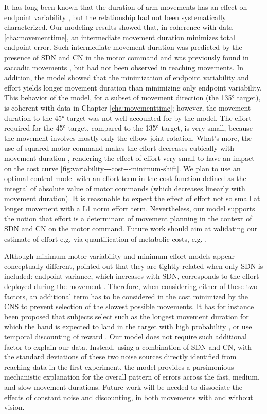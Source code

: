 It has long been known that the duration of arm movements has an effect on endpoint variability  \cite{Woodworth1899, Fitts1954}, but the relationship had not been systematically characterized. 
Our modeling results showed that, in coherence with data \ref{cha:movementtime}, an intermediate movement duration minimizes total endpoint error. 
Such intermediate movement duration was predicted by the presence of SDN and CN in the motor command and was previously found in saccadic movements \cite{VanBeers2008}, but had not been observed in reaching movements. 
In addition, the model showed that the minimization of endpoint variability and effort yields longer movement duration than minimizing only endpoint variability.
This behavior of the model, for a subset of movement direction (the \ang{135} target), is coherent with data in Chapter \ref{cha:movementtime}; however, the movement duration to the \ang{45} target was not well accounted for by the model. The effort required for the \ang{45} target, compared to the \ang{135} target, is very small, because the movement involves mostly only the elbow joint rotation. 
What's more, the use of squared motor command makes the effort decreases cubically with movement duration \cite{Shadmehr2016}, rendering the effect of effort very small to have an impact on the cost curve \ref{fig:variability---cost---minimum-shift}. 
We plan to use an optimal control model with an effort term in the cost function defined as the integral of absolute value of motor commands (which decreases linearly with movement duration).
It is reasonable to expect the effect of effort not so small at longer movement with a L1 norm effort term.
Nevertheless, our model supports the notion that effort is a determinant of movement planning in the context of SDN and CN on the motor command. 
Future work should aim at validating our estimate of effort e.g. via quantification of metabolic costs, e.g. \cite{Huang2012}.

Although minimum motor variability and minimum effort models appear conceptually different, \cite{OSullivan2009} pointed out that they are tightly related when only SDN is included: endpoint variance, which increases with SDN, corresponds to the effort deployed during the movement \cite{OSullivan2009}. 
Therefore, when considering either of these two factors, an additional term has to be considered in the cost minimized by the CNS to prevent selection of the slowest possible movements. 
It has for instance been proposed that subjects select such as the longest movement duration for which the hand is expected to land in the target with high probability \cite{Hoff1994,Harris1998,Harris2006}, or use temporal discounting of reward \cite{Shadmehr2010, Rigoux2012, Haith2012}. Our model does not require such additional factor to explain our data.
Instead, using a combination of SDN and CN, with the standard deviations of these two noise sources directly identified from reaching data in the first experiment, the model provides a parsimonious mechanistic explanation for the overall pattern of errors across the fast, medium, and slow movement durations.  
Future work will be needed to dissociate the effects of constant noise and discounting, in both movements with and without vision.

